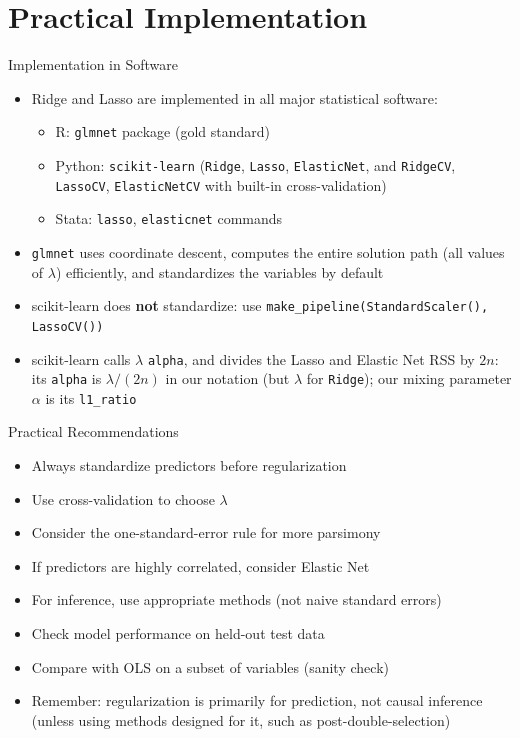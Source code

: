 \documentclass[aspectratio=169]{beamer}
\begin{document}
\section{Practical Implementation}

\begin{frame}{Implementation in Software}
\begin{itemize}
    \item Ridge and Lasso are implemented in all major statistical software:
    \begin{itemize}
        \item R: \texttt{glmnet} package (gold standard)
        \item Python: \texttt{scikit-learn} (\texttt{Ridge}, \texttt{Lasso}, \texttt{ElasticNet}, and \texttt{RidgeCV}, \texttt{LassoCV}, \texttt{ElasticNetCV} with built-in cross-validation)
        \item Stata: \texttt{lasso}, \texttt{elasticnet} commands
    \end{itemize}
    \item \texttt{glmnet} uses coordinate descent, computes the entire solution path (all values of $\lambda$) efficiently, and standardizes the variables by default
    \item scikit-learn does \textbf{not} standardize: use \texttt{make\_pipeline(StandardScaler(), LassoCV())}
    \item scikit-learn calls $\lambda$ \texttt{alpha}, and divides the Lasso and Elastic Net RSS by $2n$: its \texttt{alpha} is $\lambda/(2n)$ in our notation (but $\lambda$ for \texttt{Ridge}); our mixing parameter $\alpha$ is its \texttt{l1\_ratio}
\end{itemize}
\end{frame}

\begin{frame}{Practical Recommendations}
\begin{itemize}
    \item Always standardize predictors before regularization
    \item Use cross-validation to choose $\lambda$
    \item Consider the one-standard-error rule for more parsimony
    \item If predictors are highly correlated, consider Elastic Net
    \item For inference, use appropriate methods (not naive standard errors)
    \item Check model performance on held-out test data
    \item Compare with OLS on a subset of variables (sanity check)
    \item Remember: regularization is primarily for prediction, not causal inference (unless using methods designed for it, such as post-double-selection)
\end{itemize}
\end{frame}
\end{document}
